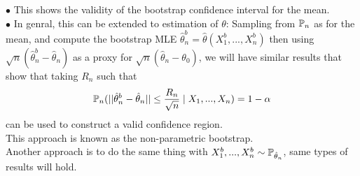 \documentclass[a4paper]{article}
\begin{document}
\begin{rem}
$\bullet$ This shows the validity of the bootstrap confidence interval for the mean.\\
$\bullet$ In genral, this can be extended to estimation of $\theta$: Sampling from $\P_n$ as for the mean, and compute the bootstrap MLE $\hat{\theta}_n^b = \hat{\theta} (X_1^b,...,X_n^b)$ then using $\sqrt{n}(\hat{\theta}_n^b - \hat{\theta}_n)$ as a proxy for $\sqrt{n} (\hat{\theta}_n - \theta_0)$, we will have similar results that show that taking $R_n$ such that $$\P_n(||\hat{\theta}_n^b - \hat{\theta}_n|| \leq \frac{R_n}{\sqrt{n}} \mid X_1,...,X_n) = 1-\alpha$$ can be used to construct a valid confidence region.\\
This approach is known as the non-parametric bootstrap.\\
Another approach is to do the same thing with $X_1^b,...,X_n^b \sim \P_{\hat{\theta}_n}$, same types of results will hold.
\end{rem}
\end{document}
